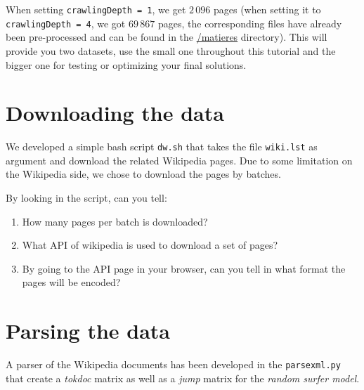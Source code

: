 \documentclass[mathserif, 11pt,c]{article}
\begin{document}
When setting \texttt{crawlingDepth = 1}, we get $2\,096$ pages (when setting it to \texttt{crawlingDepth = 4}, we got $69\,867$ pages, the corresponding files have already been pre-processed and can be found in the \url{/matieres} directory). This will provide you two datasets, use the small one throughout this tutorial and the bigger one for testing or optimizing your final solutions.

\section{Downloading the data}

We developed a simple bash script \texttt{dw.sh} that takes the file \texttt{wiki.lst} as argument and download the related Wikipedia pages. Due to some limitation on the Wikipedia side, we chose to download the pages by batches.

By looking in the script, can you tell:
\begin{enumerate}[label=\textbf{Q\thesection.\arabic*}]
	\item How many pages per batch is downloaded?
	\item What API of wikipedia is used to download a set of pages?
	\item By going to the API page in your browser, can you tell in what format the pages will be encoded?
\end{enumerate}


\section{Parsing the data}

A parser of the Wikipedia documents has been developed in the \texttt{parsexml.py} that create a \textit{tokdoc} matrix as well as a \textit{jump} matrix for the \textit{random surfer model}.
\end{document}
